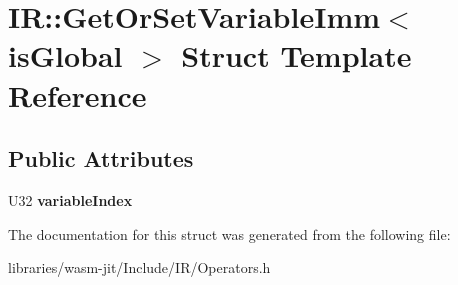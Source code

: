 \hypertarget{struct_i_r_1_1_get_or_set_variable_imm}{}\section{IR\+:\+:Get\+Or\+Set\+Variable\+Imm$<$ is\+Global $>$ Struct Template Reference}
\label{struct_i_r_1_1_get_or_set_variable_imm}
\subsection*{Public Attributes}
\begin{DoxyCompactItemize}
\item 
\mbox{\label{struct_i_r_1_1_get_or_set_variable_imm_a58f67a9226981e4cae7686ac9e65b11b}} 
U32 {\bfseries variable\+Index}
\end{DoxyCompactItemize}


The documentation for this struct was generated from the following file\+:\begin{DoxyCompactItemize}
\item 
libraries/wasm-\/jit/\+Include/\+I\+R/Operators.\+h\end{DoxyCompactItemize}
